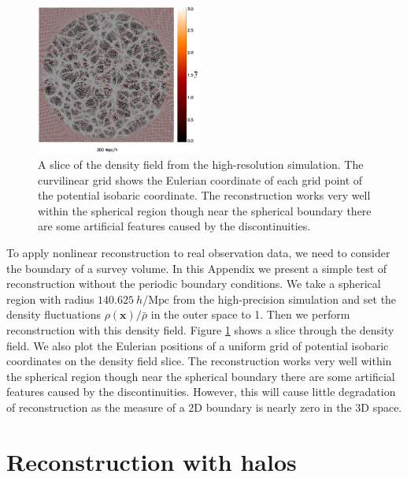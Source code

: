 \documentclass[aps,prd,twocolumn,superscriptaddress,groupedaddress,nofootinbib,amsfont]{revtex4}  %
\newcommand{\mr}{\mathrm}
\newcommand{\bmx}{\bm{x}}
\begin{document}
\begin{figure}[tbp]
\vspace{-0.7cm}
\begin{center}
\includegraphics[width=0.48\textwidth]{map0512-0256-all.eps}
\end{center}
\vspace{-0.7cm}
\caption{A slice of the density field from the high-resolution simulation. 
The curvilinear grid shows the Eulerian coordinate of each grid point of the 
potential isobaric coordinate. The reconstruction works very well within the 
spherical region though near the spherical boundary there are some artificial 
features caused by the discontinuities.}
\label{fig:mask}
\end{figure}

To apply nonlinear reconstruction to real observation data, we need to consider
the boundary of a survey volume. In this Appendix  we present a simple test of 
reconstruction without the periodic boundary conditions. We take a spherical 
region with radius $140.625\ h/\mr{Mpc}$ from the high-precision simulation and
set the density fluctuations $\rho(\bmx)/\bar{\rho}$ in the outer space to 1.
Then we perform reconstruction with this density field.
Figure \ref{fig:mask} shows a slice through the density field. We also plot the 
Eulerian positions of a uniform grid of potential isobaric coordinates on the
density field slice. The reconstruction works very well within the spherical
region though near the spherical boundary there are some artificial features
caused by the discontinuities. However, this will cause little degradation of 
reconstruction as the measure of a 2D boundary is nearly zero in the 3D space.

\section{Reconstruction with halos}
\label{appendix:D}
\end{document}
